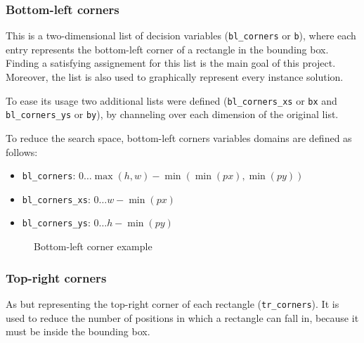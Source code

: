 \documentclass[a4paper,10pt]{article}
\begin{document}
\subsubsection*{Bottom-left corners} \label{sec:bottom-left-corners}
This is a two-dimensional list of decision variables (\texttt{bl\_corners} or \texttt{b}), where each entry represents the bottom-left corner of a rectangle in the bounding box. Finding a satisfying assignement for this list is the main goal of this project. Moreover, the list is also used to graphically represent every instance solution.

To ease its usage two additional lists were defined (\texttt{bl\_corners\_xs} or \texttt{bx} and \texttt{bl\_corners\_ys} or \texttt{by}), by channeling over each dimension of the original list.

To reduce the search space, bottom-left corners variables domains are defined as follows:
\begin{itemize}
   \item \texttt{bl\_corners}: $0 \dots \max({h, w}) - \min({\min({px}), \min({py})})$
   \item \texttt{bl\_corners\_xs}: $0 \dots w - \min({px})$
   \item \texttt{bl\_corners\_ys}: $0 \dots h - \min({py})$
\end{itemize}

\begin{figure}[h]
   \centering
   \caption{Bottom-left corner example}
\end{figure}

\subsubsection*{Top-right corners} \label{sec:top-right-corners}
As  but representing the top-right corner of each rectangle (\texttt{tr\_corners}). It is used to reduce the number of positions in which a rectangle can fall in, because it must be inside the bounding box.
\end{document}
